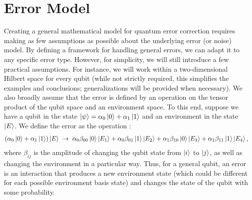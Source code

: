 \chapter{Error Model}
\label{ch:error_model}

Creating a general mathematical model for quantum error correction requires making as few assumptions as possible about the underlying error (or noise) model. By defining a framework for handling general errors, we can adapt it to any specific error type. However, for simplicity, we will still introduce a few practical assumptions. For instance, we will work within a two-dimensional Hilbert space for every qubit (while not strictly required, this simplifies the examples and conclusions; generalizations will be provided when necessary). We also broadly assume that the error is defined by an operation on the tensor product of the qubit space and an environment space. To this end, suppose we have a qubit in the state $\ket{\psi} = \alpha_0 \ket{0} + \alpha_1 \ket{1}$ and an environment in the state $\ket{E}$. We define the error as the operation \citep{Mosca2007}:
\begin{equation}
  (\alpha_0\ket{0} + \alpha_1\ket{1})\ket{E} \;\to\; \alpha_0\beta_{00} \ket{0}\ket{E_1} + \alpha_0\beta_{01} \ket{1}\ket{E_2} + \alpha_1\beta_{10} \ket{0}\ket{E_3} + \alpha_1\beta_{11} \ket{1}\ket{E_4},
\end{equation}
where $\beta_{ij}$ is the amplitude of changing the qubit state from $\ket{i}$ to $\ket{j}$, as well as changing the environment in a particular way. Thus, for a general qubit, an error is an interaction that produces a new environment state (which could be different for each possible environment basis state) and changes the state of the qubit with some probability. 


